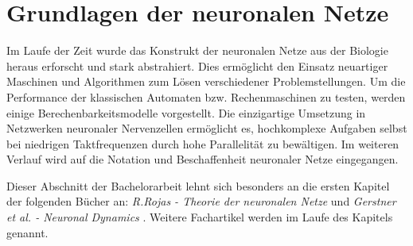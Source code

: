 %
\chapter{Grundlagen der neuronalen Netze}
\label{chap:neuro}
%
	Im Laufe der Zeit wurde das Konstrukt der neuronalen Netze aus der Biologie heraus erforscht und stark abstrahiert. Dies ermöglicht den Einsatz neuartiger Maschinen und Algorithmen zum Lösen verschiedener Problemstellungen. Um die Performance der klassischen Automaten bzw. Rechenmaschinen zu testen, werden einige Berechenbarkeitsmodelle vorgestellt. Die einzigartige Umsetzung in Netzwerken neuronaler Nervenzellen ermöglicht es, hochkomplexe Aufgaben selbst bei niedrigen Taktfrequenzen durch hohe Parallelität zu bewältigen. Im weiteren Verlauf wird auf die Notation und Beschaffenheit neuronaler Netze eingegangen.
	
	Dieser Abschnitt der Bachelorarbeit lehnt sich besonders an die ersten Kapitel der folgenden Bücher an: \textit{R.Rojas - Theorie der neuronalen Netze} \cite{TheorieNeuro} und \textit{Gerstner et al. - Neuronal Dynamics} \cite{NeuronalDynamics}. Weitere Fachartikel werden im Laufe des Kapitels genannt.
